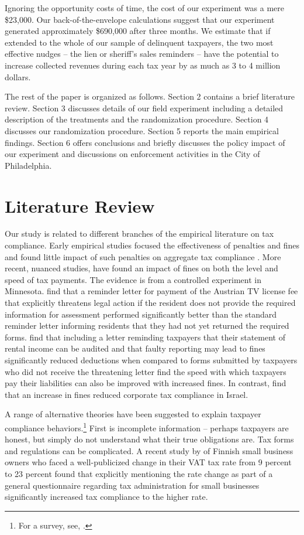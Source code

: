 \documentclass[12pt]{article}
\begin{document}
Ignoring the opportunity costs of time, the cost of our experiment was
a mere \$23,000.  Our back-of-the-envelope calculations suggest that our experiment
generated approximately \$690,000 after three months. We estimate that
if extended to the whole of our sample of delinquent taxpayers, the
two most effective nudges -- the lien or sheriff's sales reminders --
have the potential to increase collected revenues during each tax year
by as much as 3 to 4 million dollars.

The rest of the paper is organized as follows. Section 2 contains a
brief literature review. Section 3 discusses details of our field
experiment including a detailed description of the treatments and the
randomization procedure. Section 4 discusses our randomization
procedure.  Section 5 reports the main empirical findings. Section 6
offers conclusions and briefly discusses the policy impact of our
experiment and discussions on enforcement activities in the City of
Philadelphia.
    

\section{Literature Review}

Our study is related to different branches of the empirical literature
on tax compliance. Early empirical studies
focused the effectiveness of penalties and fines and found little
impact of such penalties on aggregate tax compliance
\cite{Slemrod-07}.  More recent, nuanced studies, have found an impact
of fines on both the level and speed of tax payments. The 
evidence is from a controlled experiment in Minnesota.
 find that a reminder letter for payment of the
Austrian TV license fee that explicitly threatens legal action if the
resident does not provide the required information for assessment
performed significantly better than the standard reminder letter
informing residents that they had not yet returned the required forms.
 find that including a letter reminding
taxpayers that their statement of rental income can be audited and
that faulty reporting may lead to fines significantly reduced
deductions when compared to forms submitted by taxpayers who did not
receive the threatening letter  find the speed
with which taxpayers pay their liabilities can also be improved with
increased fines.  In contrast,  find that an increase
in fines reduced corporate tax compliance in Israel.

A range of alternative theories have been suggested to explain
taxpayer compliance behaviors.\footnote{For a survey, see, 
.}  First is incomplete 
information -- perhaps taxpayers are honest,
but simply do not understand what their true obligations are. Tax
forms and regulations can be complicated.  A recent study by  of
Finnish small business owners who faced a well-publicized change in
their VAT tax rate from 9 percent to 23 percent found that explicitly
mentioning the rate change as part of a general questionnaire regarding
tax administration for small businesses significantly increased tax
compliance to the higher rate.
\end{document}
